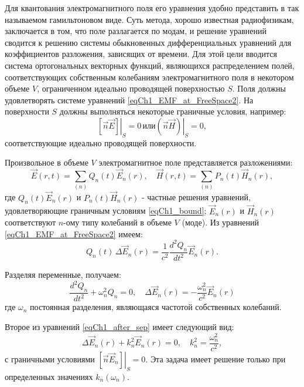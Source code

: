 Для квантования электромагнитного поля его уравнения удобно
представить в так называемом гамильтоновом виде. Суть метода, хорошо
известная радиофизикам, заключается в том, что поле разлагается по
модам, и решение уравнений сводится к решению системы обыкновенных
дифференциальных уравнений для коэффициентов разложения, зависящих от
времени. Для этой цели вводится система ортогональных векторных
функций, являющихся распределением полей, соответствующих собственным
колебаниям электромагнитного поля в некотором объеме  $V$,  ограниченном
идеально проводящей поверхностью  $S$.  Поля должны удовлетворять
системе уравнений \eqref{eqCh1_EMF_at_FreeSpace2}. На поверхности  $S$
должны выполняться некоторые граничные условия, например: 
\begin{equation}
\left. \left[ \vec{n} \vec{E} \right] \right|_S = 0 \,
\mbox{или}
\left. \left( \vec{n} \vec{H} \right) \right|_S = 0,
\label{eqCh1_bound}
\end{equation}
соответствующие идеально проводящей поверхности.

Произвольное в объеме $V$ электромагнитное поле представляется 
разложениями:
\begin{equation}
\vec{E}\left(r, t\right) = \sum_{(n)} Q_n\left(t\right)\vec{E}_n\left(r\right),
\quad
\vec{H}\left(r, t\right) = \sum_{(n)} P_n\left(t\right)\vec{H}_n\left(r\right),
\label{eqCh1_sep0}
\end{equation}
где $Q_n\left(t\right)\vec{E}_n\left(r\right)$ и 
$P_n\left(t\right)\vec{H}_n\left(r\right)$  - 
частные решения уравнений, удовлетворяющие граничным условиям
\eqref{eqCh1_bound}; $\vec{E}_n\left(r\right)$ и  
$\vec{H}_n\left(r\right)$  соответствуют $n$-ому типу 
колебаний в объеме  $V$  (моде).
Из уравнений \eqref{eqCh1_EMF_at_FreeSpace2} имеем:
\begin{equation}
Q_n\left(t\right) \, \Delta \vec{E}_n\left(r\right) = 
\frac{1}{c^2} \frac{d^2 Q_n}{d t^2}\vec{E}_n\left(r\right). 
\end{equation}

Разделяя переменные, получаем:
\begin{equation}
\frac{d^2 Q_n}{d t^2} + \omega_n^2 Q_n = 0,
\quad
\Delta \vec{E}_n \left(r\right) = - \frac{\omega_n^2}{c^2} 
\vec{E}_n \left(r\right)
\label{eqCh1_after_sep}
\end{equation}
где $\omega_n$ постоянная разделения, являющаяся частотой собственных
колебаний.

Второе из уравнений \eqref{eqCh1_after_sep} имеет следующий вид:
\begin{equation}
\Delta \vec{E}_n\left(r\right) + k_n^2 \vec{E}_n\left(r\right) = 0,
\quad
k_n^2 = \frac{\omega_n^2}{c^2},
\end{equation}
с граничными условиями  
$\left. \left[ \vec{n} \vec{E}_n \right] \right|_S = 0$.  Эта
задача имеет решение только при определенных значениях  
$k_n\left(\omega_n\right)$.  


